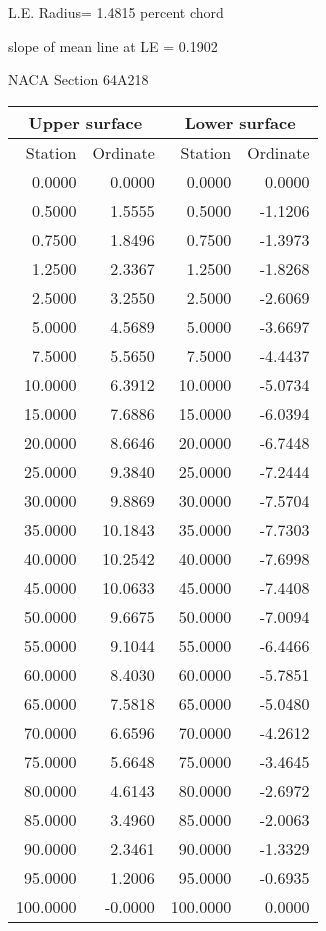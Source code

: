 \documentclass[11pt]{book}
\begin{document}
L.E. Radius=  1.4815 percent chord


 slope of mean line at LE =  0.1902
 \newpage
  \label{s64A218}
 \begin{Large}
 NACA Section 64A218
 \end{Large}
  
 \vspace{8mm}
 \begin{tabular}{|r|r|r|r|} \hline 
 \multicolumn{2}{|c|}{Upper surface} & \multicolumn{2}{|c|}{Lower surface} \\
 \hline
 Station & Ordinate & Station & Ordinate \\
 \hline
0.0000 & 0.0000 & 0.0000 & 0.0000 \\
0.5000 & 1.5555 & 0.5000 & -1.1206 \\
0.7500 & 1.8496 & 0.7500 & -1.3973 \\
1.2500 & 2.3367 & 1.2500 & -1.8268 \\
2.5000 & 3.2550 & 2.5000 & -2.6069 \\
5.0000 & 4.5689 & 5.0000 & -3.6697 \\
7.5000 & 5.5650 & 7.5000 & -4.4437 \\
10.0000 & 6.3912 & 10.0000 & -5.0734 \\
15.0000 & 7.6886 & 15.0000 & -6.0394 \\
20.0000 & 8.6646 & 20.0000 & -6.7448 \\
25.0000 & 9.3840 & 25.0000 & -7.2444 \\
30.0000 & 9.8869 & 30.0000 & -7.5704 \\
35.0000 & 10.1843 & 35.0000 & -7.7303 \\
40.0000 & 10.2542 & 40.0000 & -7.6998 \\
45.0000 & 10.0633 & 45.0000 & -7.4408 \\
50.0000 & 9.6675 & 50.0000 & -7.0094 \\
55.0000 & 9.1044 & 55.0000 & -6.4466 \\
60.0000 & 8.4030 & 60.0000 & -5.7851 \\
65.0000 & 7.5818 & 65.0000 & -5.0480 \\
70.0000 & 6.6596 & 70.0000 & -4.2612 \\
75.0000 & 5.6648 & 75.0000 & -3.4645 \\
80.0000 & 4.6143 & 80.0000 & -2.6972 \\
85.0000 & 3.4960 & 85.0000 & -2.0063 \\
90.0000 & 2.3461 & 90.0000 & -1.3329 \\
95.0000 & 1.2006 & 95.0000 & -0.6935 \\
100.0000 & -0.0000 & 100.0000 & 0.0000 \\
 \hline 
 \end{tabular}
\end{document}

